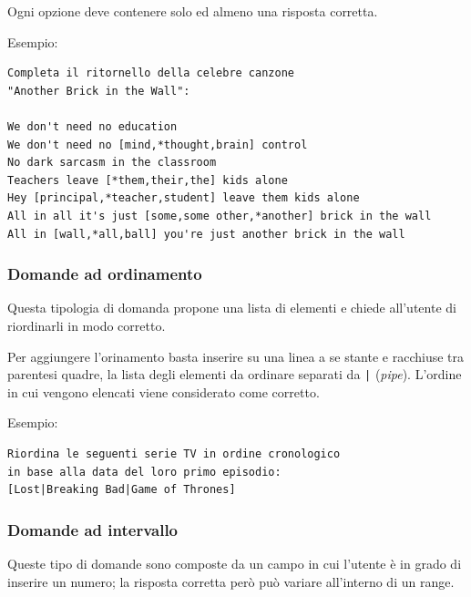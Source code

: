\documentclass[12pt,a4paper]{article}
\begin{document}
\par Ogni opzione deve contenere solo ed almeno una risposta corretta. \\

\par Esempio: \\
\begin{verbatim}
Completa il ritornello della celebre canzone 
"Another Brick in the Wall":

We don't need no education 
We don't need no [mind,*thought,brain] control 
No dark sarcasm in the classroom 
Teachers leave [*them,their,the] kids alone 
Hey [principal,*teacher,student] leave them kids alone 
All in all it's just [some,some other,*another] brick in the wall 
All in [wall,*all,ball] you're just another brick in the wall
\end{verbatim}

\subsubsection{Domande ad ordinamento}

\par Questa tipologia di domanda propone una lista di elementi e chiede all'utente di riordinarli in modo corretto. \\

\par Per aggiungere l'orinamento basta inserire su una linea a se stante e racchiuse tra parentesi quadre, la lista degli elementi da ordinare separati da \texttt{|} (\textit{pipe}). L'ordine in cui vengono elencati viene considerato come corretto. \\

\par Esempio: \\
\begin{verbatim}
Riordina le seguenti serie TV in ordine cronologico 
in base alla data del loro primo episodio:
[Lost|Breaking Bad|Game of Thrones]
\end{verbatim}

\subsubsection{Domande ad intervallo}

\par Queste tipo di domande sono composte da un campo in cui l'utente è in grado di inserire un numero; la risposta corretta però può variare all'interno di un range. \\
\end{document}
